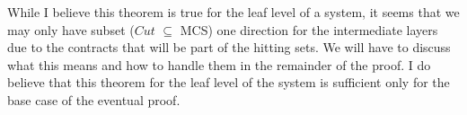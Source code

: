 While I believe this theorem is true for the leaf level of a system, it seems that we may only have subset ($Cut $ $\subseteq$ MCS) one direction for the intermediate layers due to the contracts that will be part of the hitting sets. We will have to discuss what this means and how to handle them in the remainder of the proof. I do believe that this theorem for the leaf level of the system is sufficient only for the base case of the eventual proof. 





































